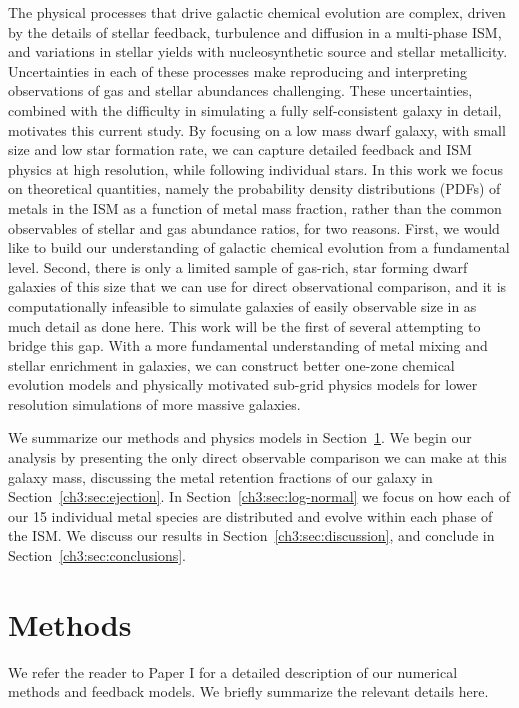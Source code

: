 The physical processes that drive galactic chemical evolution are complex, driven by the details of stellar feedback, turbulence and diffusion in a multi-phase ISM, and variations in stellar yields with nucleosynthetic source and stellar metallicity. Uncertainties in each of these processes make reproducing and interpreting observations of gas and stellar abundances challenging.
These uncertainties, combined with the difficulty in simulating a fully self-consistent galaxy in detail, motivates this current study. By focusing on a low mass dwarf galaxy, with small size and low star formation rate, we can capture detailed feedback and ISM physics at high resolution, while following individual stars. In this work we focus on theoretical quantities, namely the probability density distributions (PDFs) of metals in the ISM as a function of metal mass fraction, rather than the common observables of stellar and gas abundance ratios, for two reasons. First, we would like to build our understanding of galactic chemical evolution from a fundamental level. Second, there is only a limited sample of gas-rich, star forming dwarf galaxies of this size that we can use for direct observational comparison, and it is computationally infeasible to simulate galaxies of easily observable size in as much detail as done here. This work will be the first of several attempting to bridge this gap. With a more fundamental understanding of metal mixing and stellar enrichment in galaxies, we can construct better one-zone chemical evolution models and physically motivated sub-grid physics models for lower resolution simulations of more massive galaxies.

We summarize our methods and physics models in Section~\ref{ch3:sec:methods}. We begin our analysis by presenting the only direct observable comparison we can make at this galaxy mass, discussing the metal retention fractions of our galaxy in Section~\ref{ch3:sec:ejection}. In Section~\ref{ch3:sec:log-normal} we focus on how each of our 15 individual metal species are distributed and evolve within each phase of the ISM. We discuss our results in Section~\ref{ch3:sec:discussion}, and conclude in Section~\ref{ch3:sec:conclusions}.

\section{Methods}
\label{ch3:sec:methods}
We refer the reader to Paper I for a detailed description of our numerical methods and feedback models. We briefly summarize the relevant details here.

